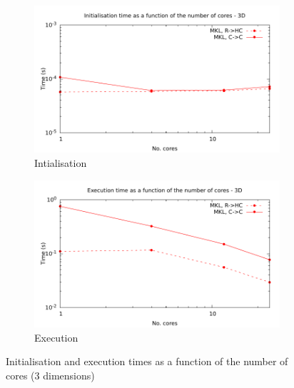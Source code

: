 \documentclass[12pt, a4paper]{article}
\begin{document}
\begin{figure}[H]
\captionsetup{width=0.8\linewidth}
\centering
\begin{subfigure}{.5\textwidth}
\centering
\includegraphics[width=.9\linewidth]{graphs/mpi-multh-init-3d.pdf}
\caption{Intialisation}
\label{3DMPIMULTHI}
\end{subfigure}%
\begin{subfigure}{.5\textwidth}
\centering
\includegraphics[width=.9\linewidth]{graphs/mpi-multh-exec-3d.pdf}
\caption{Execution}
\label{3DMPIMULTHE}
\end{subfigure}
\caption{Initialisation and execution times as a function of the number of cores (3 dimensions)}
\label{3DMPIMULTH}
\end{figure}
\end{document}
